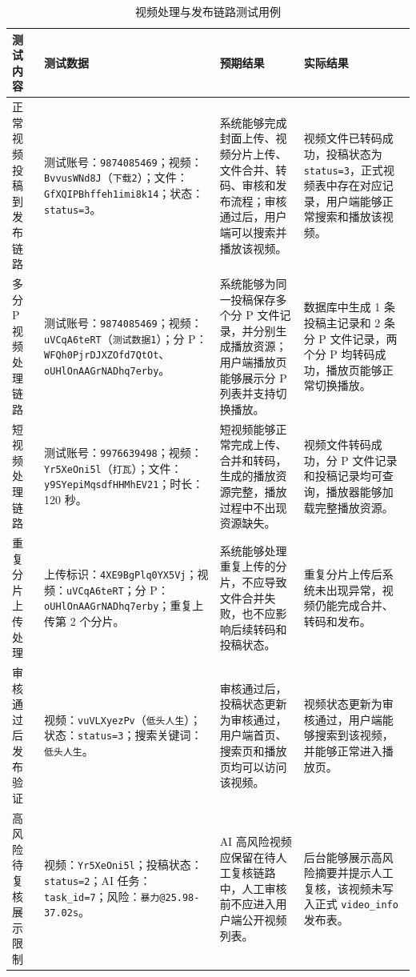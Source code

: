 \begin{table}[!htbp]
	\centering
	\small
	\setlength{\tabcolsep}{4pt}
	\renewcommand{\arraystretch}{1.35}
	\caption{视频处理与发布链路测试用例}
	\label{tab:video-process-publish-test}
	\begin{tabular}{p{}p{}p{}p{}}
		\hline
		\textbf{测试内容} & \textbf{测试数据} & \textbf{预期结果} & \textbf{实际结果} \\
		\hline
		正常视频投稿到发布链路 &
		测试账号：\texttt{9874085469}；视频：\texttt{BvvusWNd8J}（\texttt{下载2}）；文件：\texttt{GfXQIPBhffeh1imi8k14}；状态：\texttt{status=3}。 &
		系统能够完成封面上传、视频分片上传、文件合并、转码、审核和发布流程；审核通过后，用户端可以搜索并播放该视频。 &
		视频文件已转码成功，投稿状态为 \texttt{status=3}，正式视频表中存在对应记录，用户端能够正常搜索和播放该视频。 \\
		\hline
		多分 P 视频处理链路 &
		测试账号：\texttt{9874085469}；视频：\texttt{uVCqA6teRT}（\texttt{测试数据1}）；分 P：\texttt{WFQh0PjrDJXZOfd7QtOt}、\texttt{oUHlOnAAGrNADhq7erby}。 &
		系统能够为同一投稿保存多个分 P 文件记录，并分别生成播放资源；用户端播放页能够展示分 P 列表并支持切换播放。 &
		数据库中生成 1 条投稿主记录和 2 条分 P 文件记录，两个分 P 均转码成功，播放页能够正常切换播放。 \\
		\hline
		短视频处理链路 &
		测试账号：\texttt{9976639498}；视频：\texttt{Yr5XeOni5l}（\texttt{打瓦}）；文件：\texttt{y9SYepiMqsdfHHMhEV21}；时长：120 秒。 &
		短视频能够正常完成上传、合并和转码，生成的播放资源完整，播放过程中不出现资源缺失。 &
		视频文件转码成功，分 P 文件记录和投稿记录均可查询，播放器能够加载完整播放资源。 \\
		\hline
		重复分片上传处理 &
		上传标识：\texttt{4XE9BgPlq0YX5Vj}；视频：\texttt{uVCqA6teRT}；分 P：\texttt{oUHlOnAAGrNADhq7erby}；重复上传第 2 个分片。 &
		系统能够处理重复上传的分片，不应导致文件合并失败，也不应影响后续转码和投稿状态。 &
		重复分片上传后系统未出现异常，视频仍能完成合并、转码和发布。 \\
		\hline
		审核通过后发布验证 &
		视频：\texttt{vuVLXyezPv}（\texttt{低头人生}）；状态：\texttt{status=3}；搜索关键词：\texttt{低头人生}。 &
		审核通过后，投稿状态更新为审核通过，用户端首页、搜索页和播放页均可以访问该视频。 &
		视频状态更新为审核通过，用户端能够搜索到该视频，并能够正常进入播放页。 \\
		\hline
		高风险待复核展示限制 &
		视频：\texttt{Yr5XeOni5l}；投稿状态：\texttt{status=2}；AI 任务：\texttt{task\_id=7}；风险：\texttt{暴力@25.98-37.02s}。 &
		AI 高风险视频应保留在待人工复核链路中，人工审核前不应进入用户端公开视频列表。 &
		后台能够展示高风险摘要并提示人工复核，该视频未写入正式 \texttt{video\_info} 发布表。 \\
		\hline
	\end{tabular}
\end{table}

